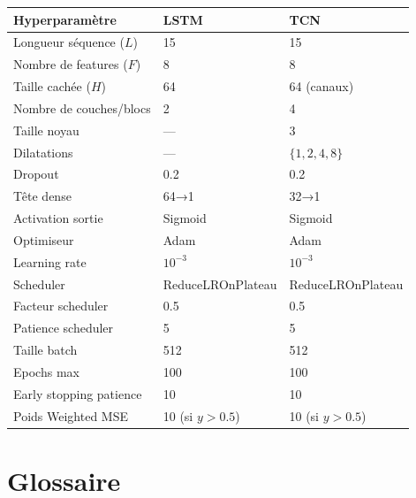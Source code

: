 \documentclass[12pt,a4paper]{report}
\begin{document}
\begin{center}
\begin{tabular}{lll}
\toprule
\rowcolor{fireOrange!15}
\textbf{Hyperparamètre} & \textcolor{lstmBlue}{\textbf{LSTM}} & \textcolor{tcnRed}{\textbf{TCN}} \\
\midrule
Longueur séquence ($L$)   & 15      & 15 \\
Nombre de features ($F$)  & 8       & 8 \\
Taille cachée ($H$)       & 64      & 64 (canaux) \\
Nombre de couches/blocs   & 2       & 4 \\
Taille noyau              & —       & 3 \\
Dilatations               & —       & $\{1, 2, 4, 8\}$ \\
Dropout                   & 0.2     & 0.2 \\
Tête dense                & 64→1    & 32→1 \\
Activation sortie         & Sigmoid & Sigmoid \\
\midrule
Optimiseur                & Adam    & Adam \\
Learning rate             & $10^{-3}$ & $10^{-3}$ \\
Scheduler                 & ReduceLROnPlateau & ReduceLROnPlateau \\
Facteur scheduler         & 0.5     & 0.5 \\
Patience scheduler        & 5       & 5 \\
Taille batch              & 512     & 512 \\
Epochs max                & 100     & 100 \\
Early stopping patience   & 10      & 10 \\
Poids Weighted MSE        & 10 (si $y > 0.5$) & 10 (si $y > 0.5$) \\
\bottomrule
\end{tabular}
\end{center}

\chapter{Glossaire}
\end{document}
